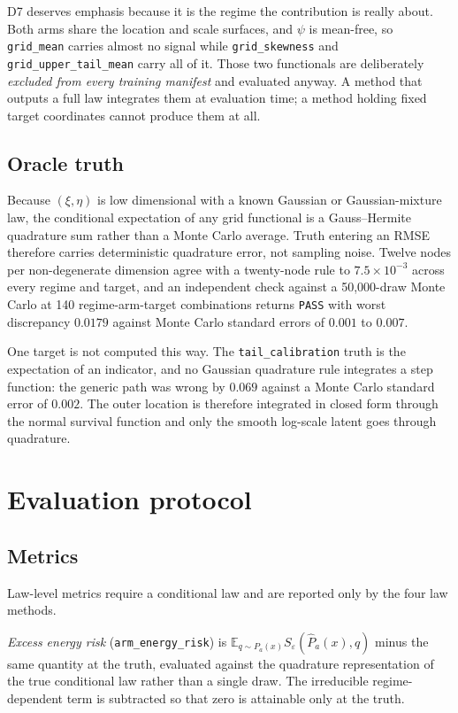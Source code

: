 \documentclass[11pt,a4paper]{article}
\theoremstyle{definition}
\theoremstyle{remark}
\newcommand{\Exp}{\mathbb{E}}
\begin{document}
D7 deserves emphasis because it is the regime the contribution is really about.
Both arms share the location and scale surfaces, and $\psi$ is mean-free, so
\texttt{grid\_mean} carries almost no signal while \texttt{grid\_skewness} and
\texttt{grid\_upper\_tail\_mean} carry all of it. Those two functionals are
deliberately \emph{excluded from every training manifest} and evaluated anyway.
A method that outputs a full law integrates them at evaluation time; a method
holding fixed target coordinates cannot produce them at all.

\subsection{Oracle truth}

Because $(\xi, \eta)$ is low dimensional with a known Gaussian or
Gaussian-mixture law, the conditional expectation of any grid functional is a
Gauss--Hermite quadrature sum rather than a Monte Carlo average. Truth entering
an RMSE therefore carries deterministic quadrature error, not sampling noise.
Twelve nodes per non-degenerate dimension agree with a twenty-node rule to
$7.5\times10^{-3}$ across every regime and target, and an independent check
against a 50{,}000-draw Monte Carlo at 140 regime-arm-target combinations returns
\texttt{PASS} with worst discrepancy $0.0179$ against Monte Carlo standard errors
of $0.001$ to $0.007$.

One target is not computed this way. The \texttt{tail\_calibration} truth is the
expectation of an indicator, and no Gaussian quadrature rule integrates a step
function: the generic path was wrong by $0.069$ against a Monte Carlo standard
error of $0.002$. The outer location is therefore integrated in closed form
through the normal survival function and only the smooth log-scale latent goes
through quadrature.

\section{Evaluation protocol}

\subsection{Metrics}

Law-level metrics require a conditional law and are reported only by the four law
methods.

\emph{Excess energy risk} (\texttt{arm\_energy\_risk}) is
$\Exp_{q \sim P_a(x)} S_\varepsilon(\hat P_a(x), q)$ minus the same quantity at
the truth, evaluated against the quadrature representation of the true
conditional law rather than a single draw. The irreducible regime-dependent term
is subtracted so that zero is attainable only at the truth.
\end{document}

